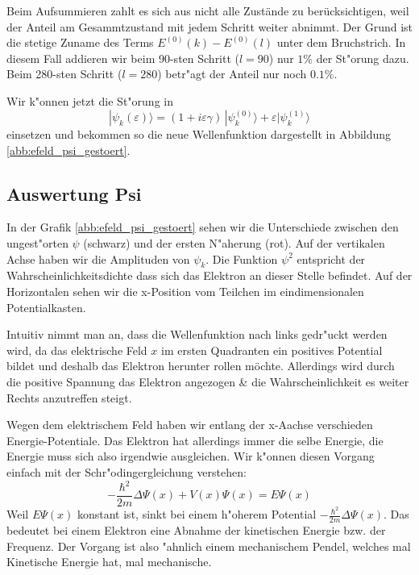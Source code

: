 \begin{refsection}
Beim Aufsummieren zahlt es sich aus nicht alle Zust\"ande zu ber\"ucksichtigen, weil der Anteil am Gesammtzustand 
mit jedem Schritt weiter abnimmt. Der Grund ist die stetige Zuname des Terms 
$E^{(0)}(k)-E^{(0)}(l)$ unter dem Bruchstrich.
In diesem Fall addieren wir beim 90-sten Schritt ($l=90$) nur $1\%$ der St"orung dazu.
Beim 280-sten Schritt ($l=280$) betr"agt der Anteil nur noch $0.1\%$.

Wir k"onnen jetzt die St"orung in 
\begin{equation}
|\psi_k(\varepsilon)\rangle
=
(1+i\varepsilon \gamma)
\,|\psi_k^{(0)}\rangle
+
\varepsilon|\psi_k^{(1)}\rangle
\end{equation}
einsetzen und bekommen so die neue Wellenfunktion dargestellt in Abbildung \ref{abb:efeld_psi_gestoert}.




\subsection{Auswertung Psi}

In der Grafik \ref{abb:efeld_psi_gestoert} sehen wir die Unterschiede zwischen den ungest"orten $\psi$ (schwarz) und der ersten N"aherung (rot).
Auf der vertikalen Achse haben wir die Amplituden von $\psi_k$.
Die Funktion $\psi^2$ entspricht der Wahrscheinlichkeitsdichte dass sich das Elektron an dieser Stelle befindet.
Auf der Horizontalen sehen wir die x-Position vom Teilchen im eindimensionalen Potentialkasten.

Intuitiv nimmt man an, dass die Wellenfunktion nach links gedr"uckt werden wird, da das
elektrische Feld $x$ im ersten Quadranten ein positives Potential bildet
und deshalb das Elektron herunter rollen m\"ochte.
Allerdings wird durch die positive Spannung das Elektron angezogen \& die
Wahrscheinlichkeit es weiter Rechts anzutreffen steigt.

Wegen dem elektrischem Feld haben wir entlang der x-Aachse verschieden Energie-Potentiale.
Das Elektron hat allerdings immer die selbe Energie,
die Energie muss sich also irgendwie ausgleichen.
Wir k"onnen diesen Vorgang einfach mit der Schr"odingergleichung verstehen:
\[
-\frac{\hbar^2}{2m}\Delta\Psi(x) + V(x)\Psi(x)
=
E \Psi(x)
\]
Weil $E \Psi(x)$ konstant ist, sinkt bei einem h"oherem Potential $-\frac{\hbar^2}{2m}\Delta\Psi(x)$.
Das bedeutet bei einem Elektron eine Abnahme der kinetischen Energie bzw. der Frequenz.
Der Vorgang ist also "ahnlich einem mechanischem Pendel, welches mal Kinetische Energie hat, mal mechanische.


\end{refsection}
